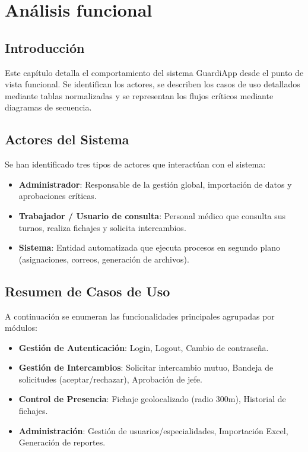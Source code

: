 \chapter{Análisis funcional} \label{cap:analisis}

\section{Introducción}
Este capítulo detalla el comportamiento del sistema GuardiApp desde el punto de vista funcional. Se identifican los actores, se describen los casos de uso detallados mediante tablas normalizadas y se representan los flujos críticos mediante diagramas de secuencia.

\section{Actores del Sistema}
Se han identificado tres tipos de actores que interactúan con el sistema:
\begin{itemize}
    \item \textbf{Administrador}: Responsable de la gestión global, importación de datos y aprobaciones críticas.
    \item \textbf{Trabajador / Usuario de consulta}: Personal médico que consulta sus turnos, realiza fichajes y solicita intercambios.
    \item \textbf{Sistema}: Entidad automatizada que ejecuta procesos en segundo plano (asignaciones, correos, generación de archivos).
\end{itemize}

\section{Resumen de Casos de Uso}
A continuación se enumeran las funcionalidades principales agrupadas por módulos:
\begin{itemize}
    \item \textbf{Gestión de Autenticación}: Login, Logout, Cambio de contraseña.
    \item \textbf{Gestión de Intercambios}: Solicitar intercambio mutuo, Bandeja de solicitudes (aceptar/rechazar), Aprobación de jefe.
    \item \textbf{Control de Presencia}: Fichaje geolocalizado (radio 300m), Historial de fichajes.
    \item \textbf{Administración}: Gestión de usuarios/especialidades, Importación Excel, Generación de reportes.
\end{itemize}


